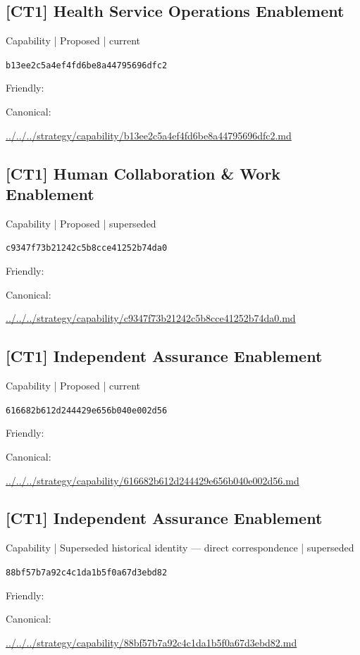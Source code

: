 \documentclass[10pt,a4paper]{article}
\begin{document}
\subsection*{[CT1] Health Service Operations Enablement}
{\small Capability | Proposed | current}\par
\texttt{b13ee2c5a4ef4fd6be8a44795696dfc2}\par
Friendly: \par
Canonical: \par
{\footnotesize\url{../../../strategy/capability/b13ee2c5a4ef4fd6be8a44795696dfc2.md}}\par
\subsection*{[CT1] Human Collaboration \& Work Enablement}
{\small Capability | Proposed | superseded}\par
\texttt{c9347f73b21242c5b8cce41252b74da0}\par
Friendly: \par
Canonical: \par
{\footnotesize\url{../../../strategy/capability/c9347f73b21242c5b8cce41252b74da0.md}}\par
\subsection*{[CT1] Independent Assurance Enablement}
{\small Capability | Proposed | current}\par
\texttt{616682b612d244429e656b040e002d56}\par
Friendly: \par
Canonical: \par
{\footnotesize\url{../../../strategy/capability/616682b612d244429e656b040e002d56.md}}\par
\subsection*{[CT1] Independent Assurance Enablement}
{\small Capability | Superseded historical identity — direct correspondence | superseded}\par
\texttt{88bf57b7a92c4c1da1b5f0a67d3ebd82}\par
Friendly: \par
Canonical: \par
{\footnotesize\url{../../../strategy/capability/88bf57b7a92c4c1da1b5f0a67d3ebd82.md}}\par
\end{document}
